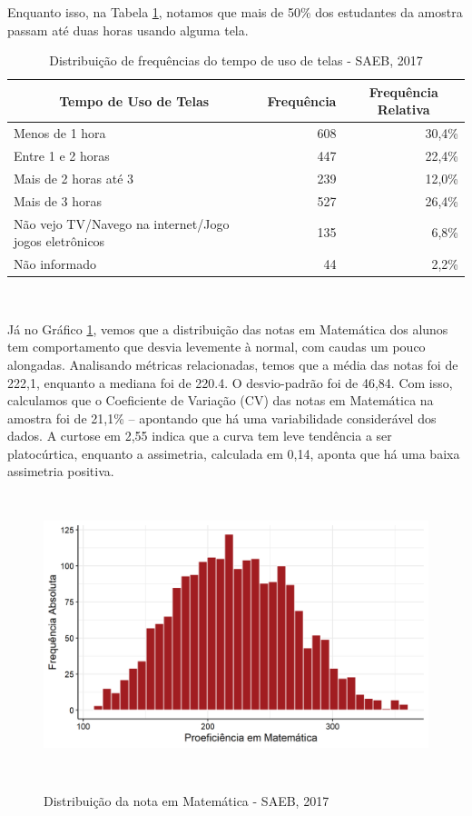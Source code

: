 \documentclass[a4paper, 12pt]{article} %
\begin{document}
Enquanto isso, na Tabela \ref{tab2}, notamos que mais de 50\% dos estudantes da amostra passam até duas horas usando alguma tela.

\begin{table}[!ht]
\caption{Distribuição de frequências do tempo de uso de telas - SAEB, 2017}
\label{tab2}
\centering
\begin{tabular}{l|rr}
\hline
\multicolumn{1}{c|}{\textbf{Tempo de Uso de Telas}} & \multicolumn{1}{c}{\textbf{Frequência}} & \multicolumn{1}{c}{\textbf{Frequência Relativa}} \\ \hline
Menos de 1 hora & 608 & 30,4\% \\
Entre 1 e 2 horas & 447 & 22,4\% \\
Mais de 2 horas até 3 & 239 & 12,0\% \\
Mais de 3 horas & 527 & 26,4\% \\
Não vejo TV/Navego na internet/Jogo jogos eletrônicos & 135 & 6,8\% \\
Não informado & 44 & 2,2\% \\ \hline
\end{tabular}
\\ 
\end{table}

Já no Gráfico \ref{fig1}, vemos que a distribuição das notas em Matemática dos alunos tem comportamento que desvia levemente à normal, com caudas um pouco alongadas. Analisando métricas relacionadas, temos que a média das notas foi de 222,1, enquanto a mediana foi de 220.4. O desvio-padrão foi de 46,84. Com isso, calculamos que o Coeficiente de Variação (CV) das notas em Matemática na amostra foi de 21,1\% -- apontando que há uma variabilidade considerável dos dados. A curtose em 2,55 indica que a curva tem leve tendência a ser platocúrtica, enquanto a assimetria, calculada em 0,14, aponta que há uma baixa assimetria positiva. 

\begin{figure}[!ht]
\vspace{-0.25cm}
\caption{Distribuição da nota em Matemática - SAEB, 2017}
\centering
\includegraphics[height=8.2cm,width=12.7cm]{figuras/GRAFICO-NOTAMT-1.png}
\vspace{-0.2cm}
\label{fig1}
\\ 
\end{figure}
\end{document}

